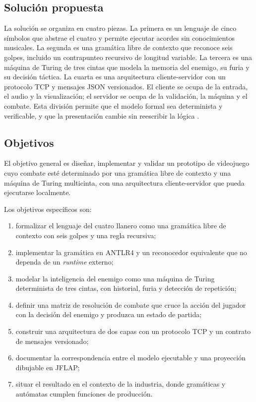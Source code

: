 \documentclass[9pt]{ieeeconf}
\begin{document}
\subsection{Solución propuesta}
\label{sec:solucion}

La solución se organiza en cuatro piezas. La primera es un lenguaje de cinco símbolos que abstrae el cuatro y permite ejecutar acordes sin conocimientos musicales. La segunda es una gramática libre de contexto que reconoce seis golpes, incluido un contrapunteo recursivo de longitud variable. La tercera es una máquina de Turing de tres cintas que modela la memoria del enemigo, su furia y su decisión táctica. La cuarta es una arquitectura cliente-servidor con un protocolo TCP y mensajes JSON versionados. El cliente se ocupa de la entrada, el audio y la visualización; el servidor se ocupa de la validación, la máquina y el combate. Esta división permite que el modelo formal sea determinista y verificable, y que la presentación cambie sin reescribir la lógica \cite{nystrom2014}.

\subsection{Objetivos}
\label{sec:objetivos}

El objetivo general es diseñar, implementar y validar un prototipo de videojuego cuyo combate esté determinado por una gramática libre de contexto y una máquina de Turing multicinta, con una arquitectura cliente-servidor que pueda ejecutarse localmente.

Los objetivos específicos son:
\begin{enumerate}
  \item formalizar el lenguaje del cuatro llanero como una gramática libre de contexto con seis golpes y una regla recursiva;
  \item implementar la gramática en ANTLR4 y un reconocedor equivalente que no dependa de un \emph{runtime} externo;
  \item modelar la inteligencia del enemigo como una máquina de Turing determinista de tres cintas, con historial, furia y detección de repetición;
  \item definir una matriz de resolución de combate que cruce la acción del jugador con la decisión del enemigo y produzca un estado de partida;
  \item construir una arquitectura de dos capas con un protocolo TCP y un contrato de mensajes versionado;
  \item documentar la correspondencia entre el modelo ejecutable y una proyección dibujable en JFLAP;
  \item situar el resultado en el contexto de la industria, donde gramáticas y autómatas cumplen funciones de producción.
\end{enumerate}
\end{document}
